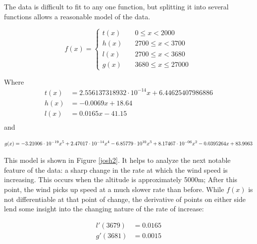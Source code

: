 \documentclass{article}
\begin{document}
The data is difficult to fit to any one function, but splitting it into several functions allows a reasonable model of the data.

$$
f(x) = \left\{
        \begin{array}{ll}
            t(x) & \quad 0 \leq x < 2000 \\
            h(x) & \quad 2700 \leq x < 3700 \\
            l(x) & \quad 2700 \leq x < 3680 \\
            g(x) & \quad 3680 \leq x \leq 27000
\        \end{array}
    \right.
$$

\noindent Where
\begin{align*}
  t(x) &= 2.556137318932\cdot10^{-14}x+6.44625407986886 \\
  h(x) &= -0.0069x+18.64 \\
  l(x) &= 0.0165x-41.15 \\
\end{align*} and

\begin{dmath*}
g(x) = -3.21006\cdot10^{-19}x^5 + 2.47017\cdot10^{-14}x^4 - 6.85779\cdot10^{10}x^3+ \\ 8.17467\cdot10^{-06}x^2-0.0395264x+83.9063
\end{dmath*}

This model is shown in Figure \ref{josh2}.  It helps to analyze the next notable feature of the data: a sharp change in the rate at which the wind speed is increasing.  This occurs when the altitude is approximately 5000\si{m}; After this point, the wind picks up speed at a much slower rate than before.  While $f(x)$ is not differentiable at that point of change, the derivative of points on either side lend some insight into the changing nature of the rate of increase:

\begin{align}
  l'(3679) &= 0.0165 \\
  g'(3681) &= 0.0015
\end{align}
\end{document}
